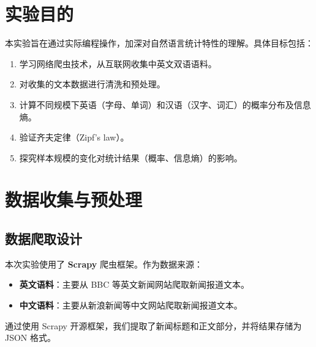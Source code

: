 \documentclass[11pt]{article}
\begin{document}


\section{实验目的}
本实验旨在通过实际编程操作，加深对自然语言统计特性的理解。具体目标包括：
\begin{enumerate}
    \item 学习网络爬虫技术，从互联网收集中英文双语语料。
    \item 对收集的文本数据进行清洗和预处理。
    \item 计算不同规模下英语（字母、单词）和汉语（汉字、词汇）的概率分布及信息熵。
    \item 验证齐夫定律（Zipf's law）。
    \item 探究样本规模的变化对统计结果（概率、信息熵）的影响。
\end{enumerate}

\section{数据收集与预处理}
\subsection{数据爬取设计}
本次实验使用了 \textbf{Scrapy} 爬虫框架。作为数据来源：
\begin{itemize}
    \item \textbf{英文语料}：主要从 BBC 等英文新闻网站爬取新闻报道文本。
    \item \textbf{中文语料}：主要从新浪新闻等中文网站爬取新闻报道文本。
\end{itemize}
通过使用 Scrapy 开源框架，我们提取了新闻标题和正文部分，并将结果存储为 JSON 格式。
\end{document}
